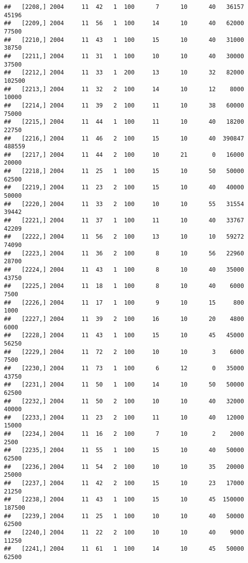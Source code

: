 \documentclass{article}\usepackage[]{graphicx}\usepackage[]{color}
\makeatletter
\newenvironment{kframe}{%
 \def\at@end@of@kframe{}%
 \ifinner\ifhmode%
  \def\at@end@of@kframe{\end{minipage}}%
  \begin{minipage}{\columnwidth}%
 \fi\fi%
 \def\FrameCommand##1{\hskip\@totalleftmargin \hskip-\fboxsep
 \colorbox{shadecolor}{##1}\hskip-\fboxsep
     \hskip-\linewidth \hskip-\@totalleftmargin \hskip\columnwidth}%
 \MakeFramed {\advance\hsize-\width
   \@totalleftmargin\z@ \linewidth\hsize
   \@setminipage}}%
 {\par\unskip\endMakeFramed%
 \at@end@of@kframe}
\newenvironment{knitrout}{}{} %
\makeatother
\begin{document}
\begin{knitrout}
\begin{kframe}
\begin{verbatim}
##   [2208,] 2004     11  42   1  100      7      10      40   36157   45196
##   [2209,] 2004     11  56   1  100     14      10      40   62000   77500
##   [2210,] 2004     11  43   1  100     15      10      40   31000   38750
##   [2211,] 2004     11  31   1  100     10      10      40   30000   37500
##   [2212,] 2004     11  33   1  200     13      10      32   82000  102500
##   [2213,] 2004     11  32   2  100     14      10      12    8000   10000
##   [2214,] 2004     11  39   2  100     11      10      38   60000   75000
##   [2215,] 2004     11  44   1  100     11      10      40   18200   22750
##   [2216,] 2004     11  46   2  100     15      10      40  390847  488559
##   [2217,] 2004     11  44   2  100     10      21       0   16000   20000
##   [2218,] 2004     11  25   1  100     15      10      50   50000   62500
##   [2219,] 2004     11  23   2  100     15      10      40   40000   50000
##   [2220,] 2004     11  33   2  100     10      10      55   31554   39442
##   [2221,] 2004     11  37   1  100     11      10      40   33767   42209
##   [2222,] 2004     11  56   2  100     13      10      10   59272   74090
##   [2223,] 2004     11  36   2  100      8      10      56   22960   28700
##   [2224,] 2004     11  43   1  100      8      10      40   35000   43750
##   [2225,] 2004     11  18   1  100      8      10      40    6000    7500
##   [2226,] 2004     11  17   1  100      9      10      15     800    1000
##   [2227,] 2004     11  39   2  100     16      10      20    4800    6000
##   [2228,] 2004     11  43   1  100     15      10      45   45000   56250
##   [2229,] 2004     11  72   2  100     10      10       3    6000    7500
##   [2230,] 2004     11  73   1  100      6      12       0   35000   43750
##   [2231,] 2004     11  50   1  100     14      10      50   50000   62500
##   [2232,] 2004     11  50   2  100     10      10      40   32000   40000
##   [2233,] 2004     11  23   2  100     11      10      40   12000   15000
##   [2234,] 2004     11  16   2  100      7      10       2    2000    2500
##   [2235,] 2004     11  55   1  100     15      10      40   50000   62500
##   [2236,] 2004     11  54   2  100     10      10      35   20000   25000
##   [2237,] 2004     11  42   2  100     15      10      23   17000   21250
##   [2238,] 2004     11  43   1  100     15      10      45  150000  187500
##   [2239,] 2004     11  25   1  100     10      10      40   50000   62500
##   [2240,] 2004     11  22   2  100     10      10      40    9000   11250
##   [2241,] 2004     11  61   1  100     14      10      45   50000   62500

\end{verbatim}
\end{kframe}
\end{knitrout}
\end{document}
